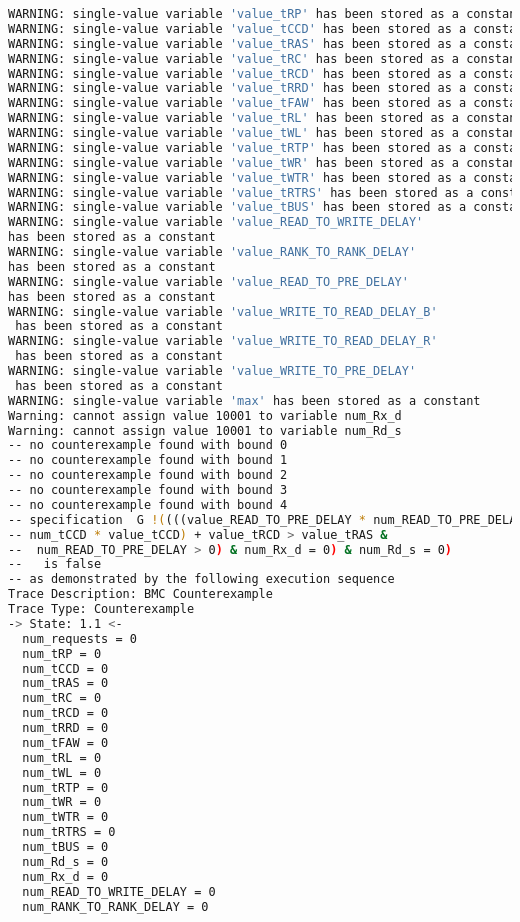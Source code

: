 \begin{lstlisting}[language=bash]
WARNING: single-value variable 'value_tRP' has been stored as a constant
WARNING: single-value variable 'value_tCCD' has been stored as a constant
WARNING: single-value variable 'value_tRAS' has been stored as a constant
WARNING: single-value variable 'value_tRC' has been stored as a constant
WARNING: single-value variable 'value_tRCD' has been stored as a constant
WARNING: single-value variable 'value_tRRD' has been stored as a constant
WARNING: single-value variable 'value_tFAW' has been stored as a constant
WARNING: single-value variable 'value_tRL' has been stored as a constant
WARNING: single-value variable 'value_tWL' has been stored as a constant
WARNING: single-value variable 'value_tRTP' has been stored as a constant
WARNING: single-value variable 'value_tWR' has been stored as a constant
WARNING: single-value variable 'value_tWTR' has been stored as a constant
WARNING: single-value variable 'value_tRTRS' has been stored as a constant
WARNING: single-value variable 'value_tBUS' has been stored as a constant
WARNING: single-value variable 'value_READ_TO_WRITE_DELAY' 
has been stored as a constant
WARNING: single-value variable 'value_RANK_TO_RANK_DELAY' 
has been stored as a constant
WARNING: single-value variable 'value_READ_TO_PRE_DELAY' 
has been stored as a constant
WARNING: single-value variable 'value_WRITE_TO_READ_DELAY_B'
 has been stored as a constant
WARNING: single-value variable 'value_WRITE_TO_READ_DELAY_R'
 has been stored as a constant
WARNING: single-value variable 'value_WRITE_TO_PRE_DELAY'
 has been stored as a constant
WARNING: single-value variable 'max' has been stored as a constant
Warning: cannot assign value 10001 to variable num_Rx_d
Warning: cannot assign value 10001 to variable num_Rd_s
-- no counterexample found with bound 0
-- no counterexample found with bound 1
-- no counterexample found with bound 2
-- no counterexample found with bound 3
-- no counterexample found with bound 4
-- specification  G !((((value_READ_TO_PRE_DELAY * num_READ_TO_PRE_DELAY +
-- num_tCCD * value_tCCD) + value_tRCD > value_tRAS &
--  num_READ_TO_PRE_DELAY > 0) & num_Rx_d = 0) & num_Rd_s = 0)
--   is false
-- as demonstrated by the following execution sequence
Trace Description: BMC Counterexample 
Trace Type: Counterexample 
-> State: 1.1 <-
  num_requests = 0
  num_tRP = 0
  num_tCCD = 0
  num_tRAS = 0
  num_tRC = 0
  num_tRCD = 0
  num_tRRD = 0
  num_tFAW = 0
  num_tRL = 0
  num_tWL = 0
  num_tRTP = 0
  num_tWR = 0
  num_tWTR = 0
  num_tRTRS = 0
  num_tBUS = 0
  num_Rd_s = 0
  num_Rx_d = 0
  num_READ_TO_WRITE_DELAY = 0
  num_RANK_TO_RANK_DELAY = 0

\end{lstlisting}
